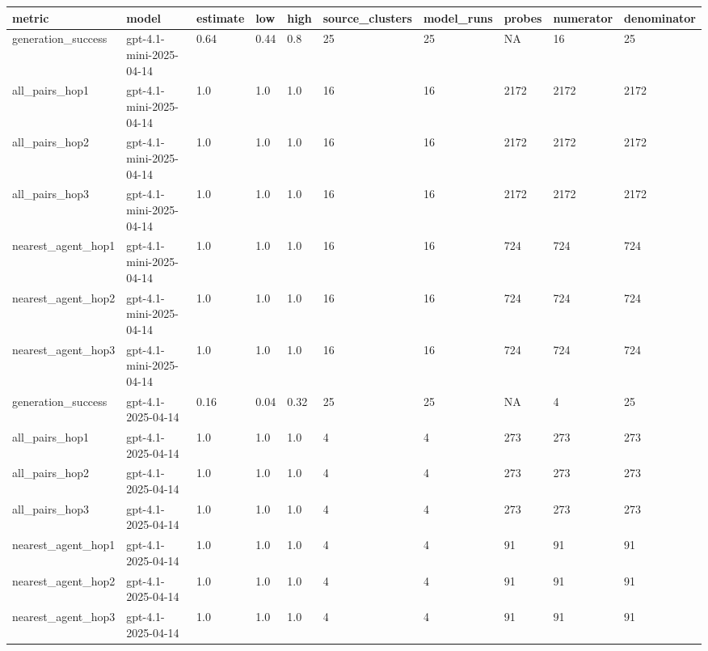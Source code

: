 \begin{tabular}{llllllllll}
\toprule
metric & model & estimate & low & high & source\_clusters & model\_runs & probes & numerator & denominator \\
\midrule
generation\_success & gpt-4.1-mini-2025-04-14 & 0.64 & 0.44 & 0.8 & 25 & 25 & NA & 16 & 25 \\
all\_pairs\_hop1 & gpt-4.1-mini-2025-04-14 & 1.0 & 1.0 & 1.0 & 16 & 16 & 2172 & 2172 & 2172 \\
all\_pairs\_hop2 & gpt-4.1-mini-2025-04-14 & 1.0 & 1.0 & 1.0 & 16 & 16 & 2172 & 2172 & 2172 \\
all\_pairs\_hop3 & gpt-4.1-mini-2025-04-14 & 1.0 & 1.0 & 1.0 & 16 & 16 & 2172 & 2172 & 2172 \\
nearest\_agent\_hop1 & gpt-4.1-mini-2025-04-14 & 1.0 & 1.0 & 1.0 & 16 & 16 & 724 & 724 & 724 \\
nearest\_agent\_hop2 & gpt-4.1-mini-2025-04-14 & 1.0 & 1.0 & 1.0 & 16 & 16 & 724 & 724 & 724 \\
nearest\_agent\_hop3 & gpt-4.1-mini-2025-04-14 & 1.0 & 1.0 & 1.0 & 16 & 16 & 724 & 724 & 724 \\
generation\_success & gpt-4.1-2025-04-14 & 0.16 & 0.04 & 0.32 & 25 & 25 & NA & 4 & 25 \\
all\_pairs\_hop1 & gpt-4.1-2025-04-14 & 1.0 & 1.0 & 1.0 & 4 & 4 & 273 & 273 & 273 \\
all\_pairs\_hop2 & gpt-4.1-2025-04-14 & 1.0 & 1.0 & 1.0 & 4 & 4 & 273 & 273 & 273 \\
all\_pairs\_hop3 & gpt-4.1-2025-04-14 & 1.0 & 1.0 & 1.0 & 4 & 4 & 273 & 273 & 273 \\
nearest\_agent\_hop1 & gpt-4.1-2025-04-14 & 1.0 & 1.0 & 1.0 & 4 & 4 & 91 & 91 & 91 \\
nearest\_agent\_hop2 & gpt-4.1-2025-04-14 & 1.0 & 1.0 & 1.0 & 4 & 4 & 91 & 91 & 91 \\
nearest\_agent\_hop3 & gpt-4.1-2025-04-14 & 1.0 & 1.0 & 1.0 & 4 & 4 & 91 & 91 & 91 \\
\bottomrule
\end{tabular}
